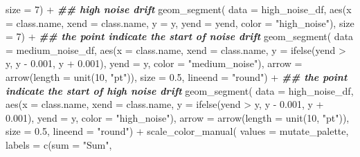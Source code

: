 \documentclass[
]{article}
\newenvironment{Shaded}{\begin{snugshade}}{\end{snugshade}}
\newcommand{\AttributeTok}[1]{\textcolor[rgb]{0.77,0.63,0.00}{#1}}
\newcommand{\DecValTok}[1]{\textcolor[rgb]{0.00,0.00,0.81}{#1}}
\newcommand{\DocumentationTok}[1]{\textcolor[rgb]{0.56,0.35,0.01}{\textbf{\textit{#1}}}}
\newcommand{\FloatTok}[1]{\textcolor[rgb]{0.00,0.00,0.81}{#1}}
\newcommand{\FunctionTok}[1]{\textcolor[rgb]{0.00,0.00,0.00}{#1}}
\newcommand{\NormalTok}[1]{#1}
\newcommand{\SpecialCharTok}[1]{\textcolor[rgb]{0.00,0.00,0.00}{#1}}
\newcommand{\StringTok}[1]{\textcolor[rgb]{0.31,0.60,0.02}{#1}}
\begin{document}
\begin{Shaded}
\begin{Highlighting}[]
        \AttributeTok{size =} \DecValTok{7}\NormalTok{) }\SpecialCharTok{+}
      \DocumentationTok{\#\# high noise drift}
      \FunctionTok{geom\_segment}\NormalTok{(}
        \AttributeTok{data =}\NormalTok{ high\_noise\_df,}
        \FunctionTok{aes}\NormalTok{(}\AttributeTok{x =}\NormalTok{ class.name, }\AttributeTok{xend =}\NormalTok{ class.name, }\AttributeTok{y =}\NormalTok{ y, }\AttributeTok{yend =}\NormalTok{ yend, }\AttributeTok{color =} \StringTok{"high\_noise"}\NormalTok{),}
        \AttributeTok{size =} \DecValTok{7}\NormalTok{) }\SpecialCharTok{+}
      \DocumentationTok{\#\# the point indicate the start of noise drift}
      \FunctionTok{geom\_segment}\NormalTok{(}
        \AttributeTok{data =}\NormalTok{ medium\_noise\_df,}
        \FunctionTok{aes}\NormalTok{(}\AttributeTok{x =}\NormalTok{ class.name, }\AttributeTok{xend =}\NormalTok{ class.name, }\AttributeTok{y =} \FunctionTok{ifelse}\NormalTok{(yend }\SpecialCharTok{\textgreater{}}\NormalTok{ y, y }\SpecialCharTok{{-}} \FloatTok{0.001}\NormalTok{, y }\SpecialCharTok{+} \FloatTok{0.001}\NormalTok{),}
          \AttributeTok{yend =}\NormalTok{ y, }\AttributeTok{color =} \StringTok{"medium\_noise"}\NormalTok{),}
        \AttributeTok{arrow =} \FunctionTok{arrow}\NormalTok{(}\AttributeTok{length =} \FunctionTok{unit}\NormalTok{(}\DecValTok{10}\NormalTok{, }\StringTok{"pt"}\NormalTok{)), }\AttributeTok{size =} \FloatTok{0.5}\NormalTok{, }\AttributeTok{lineend =} \StringTok{"round"}\NormalTok{) }\SpecialCharTok{+}
      \DocumentationTok{\#\# the point indicate the start of high noise drift}
      \FunctionTok{geom\_segment}\NormalTok{(}
        \AttributeTok{data =}\NormalTok{ high\_noise\_df,}
        \FunctionTok{aes}\NormalTok{(}\AttributeTok{x =}\NormalTok{ class.name, }\AttributeTok{xend =}\NormalTok{ class.name, }\AttributeTok{y =} \FunctionTok{ifelse}\NormalTok{(yend }\SpecialCharTok{\textgreater{}}\NormalTok{ y, y }\SpecialCharTok{{-}} \FloatTok{0.001}\NormalTok{, y }\SpecialCharTok{+} \FloatTok{0.001}\NormalTok{),}
          \AttributeTok{yend =}\NormalTok{ y, }\AttributeTok{color =} \StringTok{"high\_noise"}\NormalTok{),}
        \AttributeTok{arrow =} \FunctionTok{arrow}\NormalTok{(}\AttributeTok{length =} \FunctionTok{unit}\NormalTok{(}\DecValTok{10}\NormalTok{, }\StringTok{"pt"}\NormalTok{)), }\AttributeTok{size =} \FloatTok{0.5}\NormalTok{, }\AttributeTok{lineend =} \StringTok{"round"}\NormalTok{) }\SpecialCharTok{+}
      \FunctionTok{scale\_color\_manual}\NormalTok{(}
        \AttributeTok{values =}\NormalTok{ mutate\_palette,}
        \AttributeTok{labels =} \FunctionTok{c}\NormalTok{(}\AttributeTok{sum =} \StringTok{"Sum"}\NormalTok{,}

\end{Highlighting}
\end{Shaded}
\end{document}
